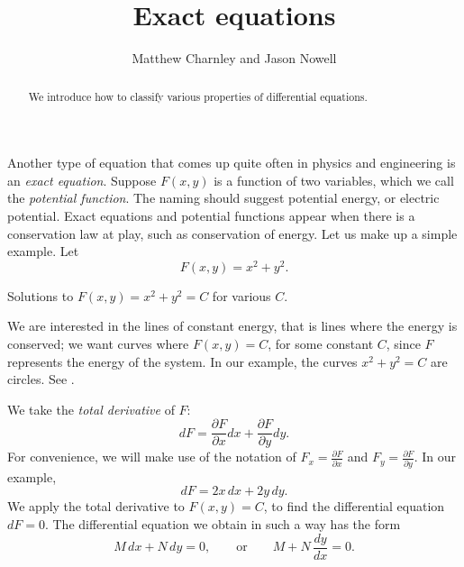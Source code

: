 \documentclass{ximera}
\title{Exact equations}
\author{Matthew Charnley and Jason Nowell}
\begin{document}
\begin{abstract}
    We introduce how to classify various properties of differential equations.
\end{abstract}
\maketitle

\label{exact:section}


Another type of equation that comes up quite often in physics and engineering is an
\emph{exact equation}.
Suppose $F(x,y)$ is a function of two variables, which we call the \emph{potential function}.  The naming should suggest potential energy, or electric potential.  Exact equations and potential functions appear when there is a conservation law at play, such as  conservation of energy. Let us make up a simple example.  Let
\begin{equation*}
    F(x,y) = x^2+y^2 .
\end{equation*}

\begin{mywrapfig}[17]{3.25in}
    \capstart
    \caption{Solutions to $F(x,y) = x^2+y^2 = C$ for various $C$.\label{exact:circlesfig}}
\end{mywrapfig}
We are interested in the lines of constant energy, that is lines where the energy is conserved;  we want curves where $F(x,y) = C$, for some constant $C$, since $F$ represents the energy of the system.  In our example, the curves $x^2+y^2=C$ are circles.  See .

We take the \emph{total derivative} of $F$:
\begin{equation*}
    dF = \frac{\partial F}{\partial x} dx + \frac{\partial F}{\partial y} dy .
\end{equation*}
For convenience, we will make use of the notation of $F_x = \frac{\partial F}{\partial x}$ and $F_y = \frac{\partial F}{\partial y}$. In our example,
\begin{equation*}
    dF = 2x \, dx + 2y \, dy .
\end{equation*}
We apply the total derivative to $F(x,y) = C$, to find the differential equation $dF = 0$.  The differential equation we obtain in such a way has the form
\begin{equation*}
    M \, dx + N \, dy = 0, \qquad \text{or} \qquad M + N \, \frac{dy}{dx} = 0 .
\end{equation*}
\end{document}
